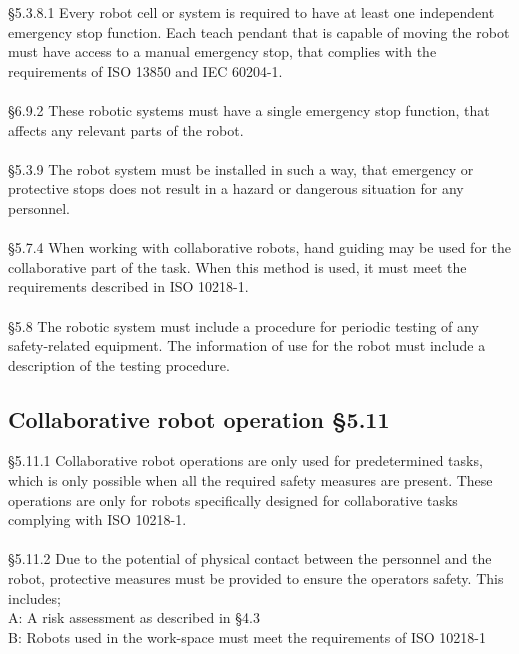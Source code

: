 \S5.3.8.1 Every robot cell or system is required to have at least one independent emergency stop function. Each teach pendant that is capable of moving the robot must have access to a manual emergency stop, that complies with the requirements of ISO 13850 and IEC 60204-1.\\ 
\\
\S6.9.2 These robotic systems must have a single emergency stop function, that affects any relevant parts of the robot.\\
\\
\S5.3.9 The robot system must be installed in such a way, that emergency or protective stops does not result in a hazard or dangerous situation for any personnel.\\
\\
\S5.7.4 When working with collaborative robots, hand guiding may be used for the collaborative part of the task. When this method is used, it must meet the requirements described in ISO 10218-1.\\
\\
\S5.8 The robotic system must include a procedure for periodic testing of any safety-related equipment. The information of use for the robot must include a description of the testing procedure. \\

\subsection{Collaborative robot operation \S5.11}

\S5.11.1 Collaborative robot operations are only used for predetermined tasks, which is only possible when all the required safety measures are present. These operations are only for robots specifically designed for collaborative tasks complying with ISO 10218-1. \\
\\
\S5.11.2 Due to the potential of physical contact between the personnel and the robot, protective measures must be provided to ensure the operators safety. This includes; \\
A: A risk assessment as described in \S4.3\\
B: Robots used in the work-space must meet the requirements of ISO 10218-1 \\
\cite{ISO10218-2}



